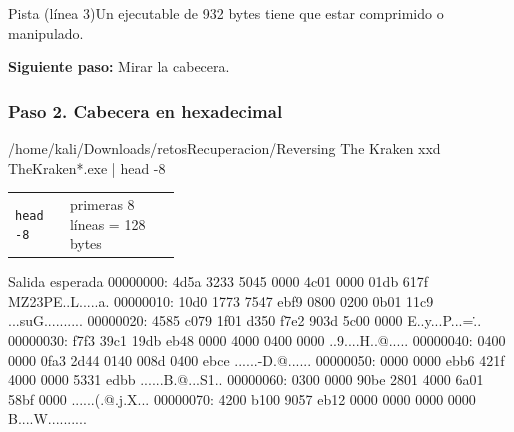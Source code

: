 \documentclass[11pt,a4paper]{article}
\begin{document}
\begin{pista}{Pista (línea 3)}Un ejecutable de 932 bytes tiene que estar comprimido o manipulado.\par\smallskip\textbf{Siguiente paso:} Mirar la cabecera.\end{pista}

\subsubsection*{Paso 2. Cabecera en hexadecimal}
\begin{comando}{/home/kali/Downloads/retosRecuperacion/Reversing The Kraken}
xxd TheKraken*.exe | head -8
\end{comando}
\begin{tcolorbox}[enhanced, breakable, colback=white, colframe=gray!40, boxrule=0.3pt, arc=1pt, left=4pt, right=4pt, top=2pt, bottom=2pt, fonttitle=\sffamily\scriptsize\bfseries, coltitle=black!75, colbacktitle=gray!8, title={Qué hace cada parte}, attach title to upper, before skip=2pt, after skip=4pt, fontupper=\small]
\par{\renewcommand{\arraystretch}{1.12}\begin{tabularx}{\linewidth}{@{}>{\raggedright\arraybackslash}p{0.33\linewidth}>{\raggedright\arraybackslash}X@{}}
\texttt{head -8} & primeras 8 líneas = 128 bytes \\
\end{tabularx}}
\end{tcolorbox}
\begin{salidan}{Salida esperada}
00000000: 4d5a 3233 5045 0000 4c01 0000 01db 617f  MZ23PE..L.....a.
00000010: 10d0 1773 7547 ebf9 0800 0200 0b01 11c9  ...suG..........
00000020: 4585 c079 1f01 d350 f7e2 903d 5c00 0000  E..y...P...=\...
00000030: f7f3 39c1 19db eb48 0000 4000 0400 0000  ..9....H..@.....
00000040: 0400 0000 0fa3 2d44 0140 008d 0400 ebce  ......-D.@......
00000050: 0000 0000 ebb6 421f 4000 0000 5331 edbb  ......B.@...S1..
00000060: 0300 0000 90be 2801 4000 6a01 58bf 0000  ......(.@.j.X...
00000070: 4200 b100 9057 eb12 0000 0000 0000 0000  B....W..........
\end{salidan}
\end{document}
